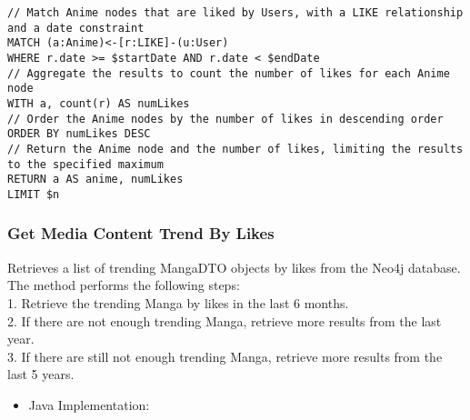 \begin{mdframed}[style=customstyle]
\begin{lstlisting}[language=Cypher]
// Match Anime nodes that are liked by Users, with a LIKE relationship and a date constraint
MATCH (a:Anime)<-[r:LIKE]-(u:User)
WHERE r.date >= $startDate AND r.date < $endDate
// Aggregate the results to count the number of likes for each Anime node
WITH a, count(r) AS numLikes
// Order the Anime nodes by the number of likes in descending order
ORDER BY numLikes DESC
// Return the Anime node and the number of likes, limiting the results to the specified maximum
RETURN a AS anime, numLikes
LIMIT $n\end{lstlisting}
\end{mdframed}

\subsubsection*{Get Media Content Trend By Likes}

Retrieves a list of trending MangaDTO objects by likes from the Neo4j database.
The method performs the following steps:\\
1. Retrieve the trending Manga by likes in the last 6 months.\\
2. If there are not enough trending Manga, retrieve more results from the last year.\\
3. If there are still not enough trending Manga, retrieve more results from the last 5 years.\\
\begin{itemize}
    \item Java Implementation:
\end{itemize}

